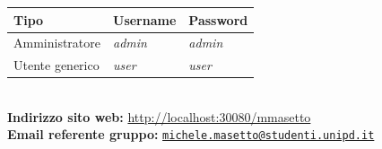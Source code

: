 \begin{titlepage}
\begin{center}
\begin{tabular}{| C{2.9cm} | C{2.9cm} | C{2.9cm} |}
		\hline
		\textbf{Tipo} & \textbf{Username} & \textbf{Password}\\
		\hline
		Amministratore & \textit{admin} & \textit{admin}\\
		Utente generico & \textit{user} & \textit{user}\\
		\hline
	\end{tabular}\\
	\vspace{0.7cm}
	\textbf{Indirizzo sito web:}  \url{http://localhost:30080/mmasetto}\\
	\textbf{Email referente gruppo:}
	\texttt{\href{mailto:michele.masetto@studenti.unipd.it}{michele.masetto@studenti.unipd.it}}\\
\end{center}
\end{titlepage}